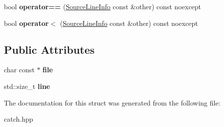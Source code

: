 \begin{DoxyCompactItemize}
\item 
bool {\bfseries operator==} (\hyperlink{structCatch_1_1SourceLineInfo}{Source\+Line\+Info} const \&other) const noexcept\hypertarget{structCatch_1_1SourceLineInfo_af07e4fdeddf8409b91e4f842f6264cf8}{}\label{structCatch_1_1SourceLineInfo_af07e4fdeddf8409b91e4f842f6264cf8}

\item 
bool {\bfseries operator$<$} (\hyperlink{structCatch_1_1SourceLineInfo}{Source\+Line\+Info} const \&other) const noexcept\hypertarget{structCatch_1_1SourceLineInfo_af77415416919d2d6030b4be085b92f7a}{}\label{structCatch_1_1SourceLineInfo_af77415416919d2d6030b4be085b92f7a}

\end{DoxyCompactItemize}
\subsection*{Public Attributes}
\begin{DoxyCompactItemize}
\item 
char const $\ast$ {\bfseries file}\hypertarget{structCatch_1_1SourceLineInfo_ad65537703e9f08c1fa7777fbc3f0c617}{}\label{structCatch_1_1SourceLineInfo_ad65537703e9f08c1fa7777fbc3f0c617}

\item 
std\+::size\+\_\+t {\bfseries line}\hypertarget{structCatch_1_1SourceLineInfo_a841e5d696c7b9cde24e45e61dd979c77}{}\label{structCatch_1_1SourceLineInfo_a841e5d696c7b9cde24e45e61dd979c77}

\end{DoxyCompactItemize}


The documentation for this struct was generated from the following file\+:\begin{DoxyCompactItemize}
\item 
catch.\+hpp\end{DoxyCompactItemize}
